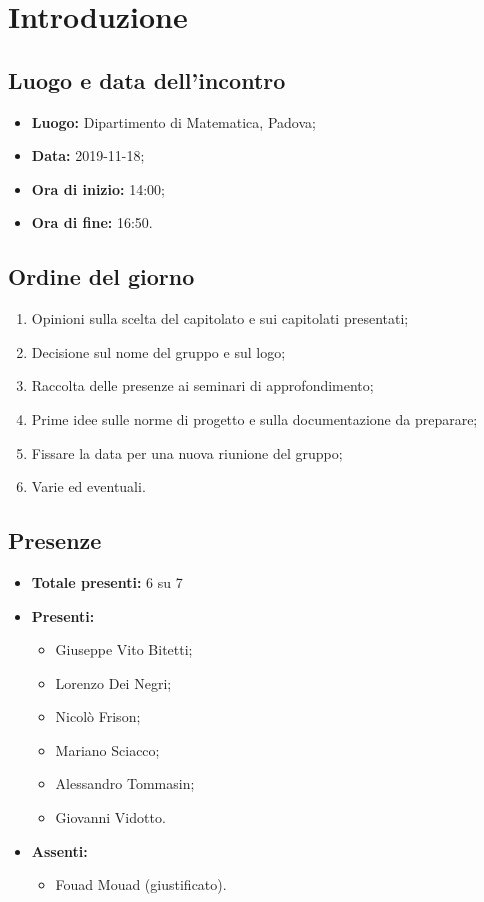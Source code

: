 \section*{Introduzione}

\subsection*{Luogo e data dell'incontro}
	\begin{itemize}
		\item \textbf{Luogo:} Dipartimento di Matematica, Padova;
		\item \textbf{Data:} 2019-11-18;
		\item \textbf{Ora di inizio:} 14:00;
		\item \textbf{Ora di fine:} 16:50.
	\end{itemize}

\subsection*{Ordine del giorno}
	\begin{enumerate}
		\item Opinioni sulla scelta del capitolato e sui capitolati presentati;
		\item Decisione sul nome del gruppo e sul logo;
		\item Raccolta delle presenze ai seminari di approfondimento;
		\item Prime idee sulle norme di progetto e sulla documentazione da preparare;
		\item Fissare la data per una nuova riunione del gruppo;
		\item Varie ed eventuali.
	\end{enumerate}

\subsection*{Presenze}
	\begin{itemize}
		\item \textbf{Totale presenti:} 6 su 7
		\item \textbf{Presenti: }
			\begin{itemize}			
				\item Giuseppe Vito Bitetti;
				\item Lorenzo Dei Negri;
				\item Nicolò Frison;
				\item Mariano Sciacco;
				\item Alessandro Tommasin;
				\item Giovanni Vidotto.
			\end{itemize}
		\item \textbf{Assenti: } 
			\begin{itemize}	
				\item Fouad Mouad (giustificato).
			\end{itemize}
	\end{itemize}



